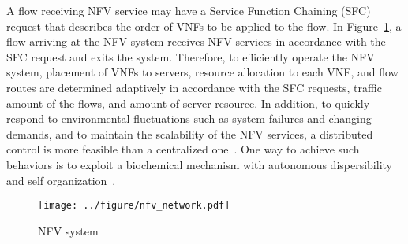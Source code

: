 \documentclass[technicalreport]{ieicej}
\begin{document}
	A flow receiving NFV service may have a Service Function Chaining (SFC) request that describes the order of VNFs to be applied to the flow.
	In Figure~\ref{fig:nfv_network}, a flow arriving at the NFV system receives NFV services in accordance with the SFC request and exits the system.
	Therefore, to efficiently operate the NFV system, placement of VNFs to servers, resource allocation to each VNF, and flow routes are determined adaptively in accordance with the SFC requests, traffic amount of the flows, and amount of server resource.
	In addition, to quickly respond to environmental fluctuations such as system failures and changing demands, and to maintain the scalability of the NFV services, a distributed control is more feasible than a centralized one~\cite{allybokus2018jsac}.
	One way to achieve such behaviors is to exploit a biochemical mechanism with autonomous dispersibility and self organization~\cite{mirkoviroli2011taas	}.

	\begin{figure}[!t]
		\begin{center}
			\texttt{[image: ../figure/nfv\_network.pdf]}
		\end{center}
		\caption{NFV system}
		\label{fig:nfv_network}
	\end{figure}
\end{document}
